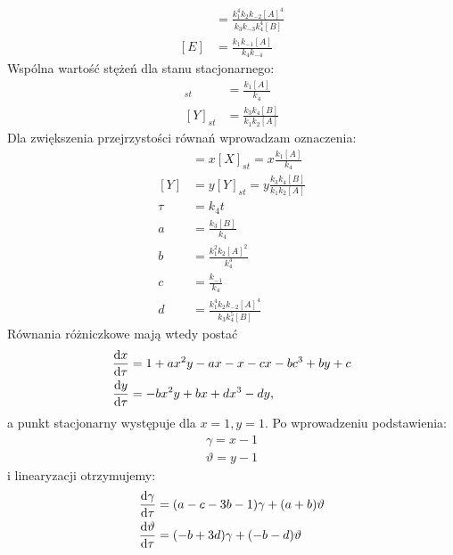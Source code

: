 \documentclass[10pt, a4paper, twoside, onecolumn]{article}
\numberwithin{equation}{section}
\begin{document}
	\begin{align}
		[D] &= \frac{k_{1}^{4}k_{2}k_{-2}[A]^{4}}{k_{3}k_{-3}k_{4}^{4}[B]} \\
		[E] &= \frac{k_{1}k_{-1}[A]}{k_{4}k_{-4}}
	\end{align}
	Wspólna wartość stężeń dla stanu stacjonarnego:
	\begin{align}
		[X]_{st} &= \frac{k_{1}[A]}{k_{4}} \\
		[Y]_{st} &= \frac{k_{3}k_{4}[B]}{k_{1}k_{2}[A]}
	\end{align}
	Dla zwiększenia przejrzystości równań wprowadzam oznaczenia: 
	\begin{align}
		[X] &= x[X]_{st} = x\frac{k_{1}[A]}{k_{4}} \\
		[Y] &= y[Y]_{st} = y\frac{k_{3}k_{4}[B]}{k_{1}k_{2}[A]} \\
		\tau &= k_{4}t \\
		a &= \frac{k_{3}[B]}{k_{4}} \\
		b &= \frac{k_{1}^{2}k_{2}[A]^{2}}{k_{4}^{3}} \\
		c &= \frac{k_{-1}}{k_{4}} \\
		d &= \frac{k_{1}^{4}k_{2}k_{-2}[A]^{4}}{k_{3}k_{4}^{5}[B]}
	\end{align}
	Równania różniczkowe mają wtedy postać
	\begin{align}
		\dv{x}{\tau} &= 1 + ax^{2}y - ax - x - cx - bc^{3} + by + c \\
		\dv{y}{\tau} &= -bx^{2}y + bx + dx^{3} - dy, 
	\end{align}
	a punkt stacjonarny występuje dla \(x=1, y=1\). 
	Po wprowadzeniu podstawienia:
	\begin{gather*}
		\gamma = x - 1 \\
		\vartheta = y - 1
	\end{gather*}
	i linearyzacji otrzymujemy:
	\begin{align}
		\dv{\gamma}{\tau} &= (a - c - 3b - 1)\gamma + (a + b)\vartheta \\
		\dv{\vartheta}{\tau} &= (- b + 3d)\gamma + (- b - d)\vartheta
	\end{align}
	
\end{document}
